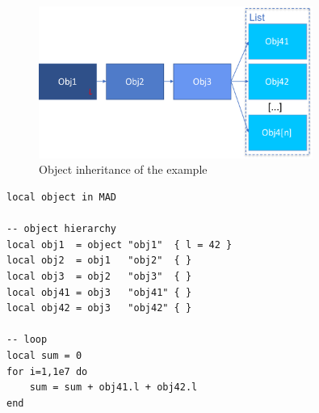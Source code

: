 \begin{figure}[H]
    \centering
    \includegraphics[width=0.8\textwidth]{./Images/MO-ex.pdf}
    \caption{Object inheritance of the example}
    \label{fig:MO-ex}
\end{figure}

\begin{lstlisting}[style=LuaStyle]
local object in MAD

-- object hierarchy
local obj1  = object "obj1"  { l = 42 }
local obj2  = obj1   "obj2"  { }
local obj3  = obj2   "obj3"  { }
local obj41 = obj3   "obj41" { }
local obj42 = obj3   "obj42" { }

-- loop
local sum = 0
for i=1,1e7 do
	sum = sum + obj41.l + obj42.l
end
\end{lstlisting}

